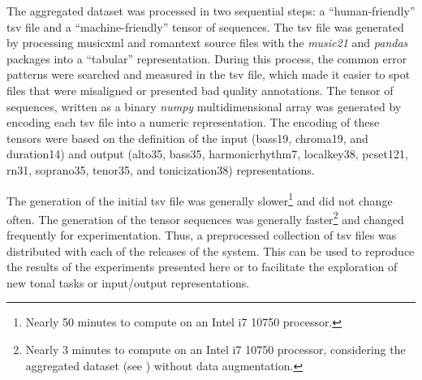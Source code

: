 
The aggregated dataset was processed in two sequential
steps: a ``human-friendly'' \gls{tsv} file and a
``machine-friendly'' tensor of sequences. The \gls{tsv} file
was generated by processing \gls{musicxml} and
\gls{romantext} source files with the \emph{music21}
\parencite{cuthbert2010music21} and \emph{pandas}
\parencite{mckinney2011pandas} packages into a ``tabular''
representation. During this process, the common error
patterns were searched and measured in the \gls{tsv} file,
which made it easier to spot files that were misaligned or
presented bad quality annotations. The tensor of sequences,
written as a binary \emph{numpy}
\parencite{oliphant2006guide} multidimensional array was
generated by encoding each \gls{tsv} file into a numeric
representation. The encoding of these tensors were based on
the definition of the input (\gls{bass19}, \gls{chroma19},
and \gls{duration14}) and output (\gls{alto35},
\gls{bass35}, \gls{harmonicrhythm7}, \gls{localkey38},
\gls{pcset121}, \gls{rn31}, \gls{soprano35}, \gls{tenor35},
and \gls{tonicization38}) representations.

The generation of the initial \gls{tsv} file was generally
slower\footnote{Nearly 50 minutes to compute on an Intel i7
10750 processor.} and did not change often. The generation
of the tensor sequences was generally faster\footnote{Nearly
3 minutes to compute on an Intel i7 10750 processor,
considering the aggregated dataset (see
) without data augmentation.}
and changed frequently for experimentation. Thus, a
preprocessed collection of \gls{tsv} files was distributed
with each of the releases of the system. This can be used to
reproduce the results of the experiments presented here or
to facilitate the exploration of new tonal tasks or
input/output representations.
